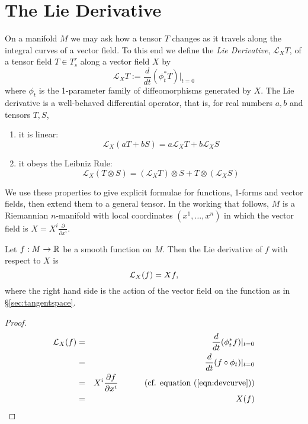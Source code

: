 \section{The Lie Derivative}

On a manifold $M$ we may ask how a tensor $T$ changes as it travels along the integral curves of a vector field.  To this end we define the \textit{Lie Derivative}, $\mathcal{L}_X T$, of a tensor field $T\in T^r_s$ along a vector field $X$  by
\begin{equation}
\mathcal{L}_X T := \frac{d}{dt}(\phi_t^* T)|_{t=0}
\label{eq:Liedef}
\end{equation}
where $\phi_t$ is the 1-parameter family of diffeomorphisms generated by $X$. The Lie derivative is a well-behaved differential operator, that is, for real numbers $a,b$ and tensors $T,S$,
 \begin{enumerate} \item it is linear:
\begin{equation} \mathcal{L}_X (aT + bS) = a\mathcal{L}_X T+ b\mathcal{L}_X S \label{eq:Lielinear}\end{equation}
\item it obeys the Leibniz Rule:
\begin{equation} \mathcal{L}_X(T\otimes S)=(\mathcal{L}_X T)\otimes S + T\otimes(\mathcal{L}_X S) \label{eq:LieLeibniz}\end{equation}
\end{enumerate}
We use these properties to give explicit formulae for functions, 1-forms and vector fields, then extend them to a general tensor. In the working that follows, $M$ is a Riemannian $n$-manifold with local coordinates $(x^1,\dots,x^n)$ in which the vector field is $X=X^i\frac{\partial}{\partial x^i}$.

\begin{thm}
Let $f:M\rightarrow {\mathbb R}$ be a smooth function on $M$. Then the Lie derivative of $f$ with respect to $X$ is
\begin{equation} {\mathcal{L}}_X (f) = X f, \label{eq:LieFunction}\end{equation}
where the right hand side is the action of the vector field on the function as in {\S}\ref{sec:tangentspace}.
\end{thm}
\begin{proof}
\begin{eqnarray*}
{\mathcal{L}}_X (f) &=& \frac{d}{dt}(\phi_t^* f)|_{t=0}\\
&=& \frac{d}{dt}(f \circ \phi_t)|_{t=0}\\
&=& X^i\frac{{\partial} f}{{\partial} x^i} \mbox{\hspace{1cm} (cf. equation (\ref{eqn:devcurve}))}\\
&=& X(f)
\end{eqnarray*}
\end{proof}

